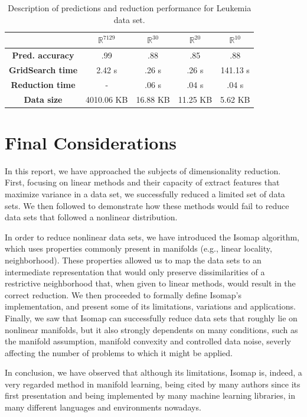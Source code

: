 \documentclass[12pt]{article}
\begin{document}
\begin{table}[H]
	\centering
	\begin{tabular}{|c|c|c|c|c|}
		\hline
		& \textbf{$\mathbb{R}^{7129}$} & \textbf{$\mathbb{R}^{30}$} & \textbf{$\mathbb{R}^{20}$} & \textbf{$\mathbb{R}^{10}$} \\\hline
		\textbf{Pred. accuracy}    & .99 & .88 & .85 & .88 \\\hline
		\textbf{GridSearch time}   & 2.42 s & .26 s & .26 s & 141.13 s \\\hline
		\textbf{Reduction time}    & - & .06 s & .04 s & .04 s \\\hline
		\textbf{Data size}         & 4010.06 KB & 16.88 KB & 11.25 KB & 5.62 KB \\\hline
	\end{tabular}
	\captionsetup{justification=centering}	
	\caption{Description of predictions and reduction performance for Leukemia data set.}
\end{table}

\newpage
\section{Final Considerations}


In this report, we have approached the subjects of dimensionality reduction. First, focusing on linear methods and their capacity of extract features that maximize variance in a data set, we successfully reduced a limited set of data sets. We then followed to demonstrate how these methods would fail to reduce data sets that followed a nonlinear distribution.

In order to reduce nonlinear data sets, we have introduced the Isomap algorithm, which uses properties commonly present in manifolds (e.g., linear locality, neighborhood). These properties allowed us to map the data sets to an intermediate representation that would only preserve dissimilarities of a restrictive neighborhood that, when given to linear methods, would result in the correct reduction. We then proceeded to formally define Isomap's implementation, and present some of its limitations, variations and applications. Finally, we saw that Isomap can successfully reduce data sets that roughly lie on nonlinear manifolds, but it also strongly dependents on many conditions, such as the manifold assumption, manifold convexity and controlled data noise, severly affecting the number of problems to which it might be applied.

In conclusion, we have observed that although its limitations, Isomap is, indeed, a very regarded method in manifold learning, being cited by many authors since its first presentation and being implemented by many machine learning libraries, in many different languages and environments nowadays.

\newpage



\end{document}
